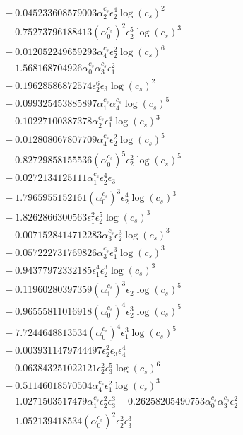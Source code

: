 \documentclass[10pt]{article}
\begin{document}
\begin{align*}
&{}  - 0.045233608579003 \alpha_{2}^{c_s} \epsilon_{2}^{4} \log{\left(c_{s} \right)}^{2} \\
&{}  - 0.75273796188413 \left(\alpha_{0}^{c_s}\right)^{2} \epsilon_{2}^{5} \log{\left(c_{s} \right)}^{3} \\
&{}  - 0.012052249659293 \alpha_{4}^{c_s} \epsilon_{2}^{2} \log{\left(c_{s} \right)}^{6} \\
&{}  - 1.568168704926 \alpha_{0}^{c_s} \alpha_{3}^{c_s} \epsilon_{1}^{2} \\
&{}  - 0.19628586872574 \epsilon_{2}^{6} \epsilon_{3} \log{\left(c_{s} \right)}^{2} \\
&{}  - 0.099325453885897 \alpha_{1}^{c_s} \alpha_{4}^{c_s} \log{\left(c_{s} \right)}^{5} \\
&{}  - 0.10227100387378 \alpha_{2}^{c_s} \epsilon_{1}^{4} \log{\left(c_{s} \right)}^{3} \\
&{}  - 0.012808067807709 \alpha_{4}^{c_s} \epsilon_{2}^{2} \log{\left(c_{s} \right)}^{5} \\
&{}  - 0.82729858155536 \left(\alpha_{0}^{c_s}\right)^{5} \epsilon_{2}^{2} \log{\left(c_{s} \right)}^{5} \\
&{}  - 0.0272134125111 \alpha_{1}^{c_s} \epsilon_{2}^{4} \epsilon_{3} \\
&{}  - 1.7965955152161 \left(\alpha_{0}^{c_s}\right)^{3} \epsilon_{2}^{4} \log{\left(c_{s} \right)}^{3} \\
&{}  - 1.8262866300563 \epsilon_{1}^{2} \epsilon_{2}^{5} \log{\left(c_{s} \right)}^{3} \\
&{}  - 0.0071528414712283 \alpha_{3}^{c_s} \epsilon_{2}^{3} \log{\left(c_{s} \right)}^{3} \\
&{}  - 0.057222731769826 \alpha_{3}^{c_s} \epsilon_{1}^{3} \log{\left(c_{s} \right)}^{3} \\
&{}  - 0.94377972332185 \epsilon_{1}^{4} \epsilon_{2}^{3} \log{\left(c_{s} \right)}^{3} \\
&{}  - 0.11960280397359 \left(\alpha_{1}^{c_s}\right)^{3} \epsilon_{2} \log{\left(c_{s} \right)}^{5} \\
&{}  - 0.96555811016918 \left(\alpha_{0}^{c_s}\right)^{4} \epsilon_{2}^{3} \log{\left(c_{s} \right)}^{5} \\
&{}  - 7.7244648813534 \left(\alpha_{0}^{c_s}\right)^{4} \epsilon_{1}^{3} \log{\left(c_{s} \right)}^{5} \\
&{}  - 0.0039311479744497 \epsilon_{2}^{2} \epsilon_{3} \epsilon_{4}^{4} \\
&{}  - 0.063843251022121 \epsilon_{2}^{2} \epsilon_{3}^{5} \log{\left(c_{s} \right)}^{6} \\
&{}  - 0.51146018570504 \alpha_{4}^{c_s} \epsilon_{1}^{2} \log{\left(c_{s} \right)}^{3} \\
&{}  - 1.0271503517479 \alpha_{1}^{c_s} \epsilon_{2}^{2} \epsilon_{3}^{3} - 0.26258205490753 \alpha_{0}^{c_s} \alpha_{3}^{c_s} \epsilon_{2}^{2} \\
&{}  - 1.052139418534 \left(\alpha_{0}^{c_s}\right)^{2} \epsilon_{2}^{2} \epsilon_{3}^{3}
\end{align*}
\end{document}

